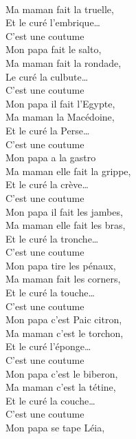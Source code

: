 \\Ma maman fait la truelle, \bissimple
\\Et le curé l’embrique… \bissimple
\\
{C’est une coutume}
\\Mon papa fait le salto, \bissimple
\\Ma maman fait la rondade, \bissimple
\\Le curé la culbute… \bissimple
\\
{C’est une coutume}
\\Mon papa il fait l’Egypte, \bissimple
\\Ma maman la Macédoine, \bissimple
\\Et le curé la Perse… \bissimple
\\
{C’est une coutume}
\\Mon papa a la gastro \bissimple
\\Ma maman elle fait la grippe, \bissimple
\\Et le curé la crève… \bissimple
\\
{C’est une coutume}
\\Mon papa il fait les jambes, \bissimple
\\Ma maman elle fait les bras, \bissimple
\\Et le curé la tronche… \bissimple
\\
{C’est une coutume}
\\Mon papa tire les pénaux, \bissimple
\\Ma maman fait les corners, \bissimple
\\Et le curé la touche… \bissimple
\breakpage
\\
{C’est une coutume}
\\Mon papa c’est Paic citron, \bissimple
\\Ma maman c’est le torchon, \bissimple
\\Et le curé l’éponge… \bissimple
\\
{C’est une coutume}
\\Mon papa c’est le biberon, \bissimple
\\Ma maman c’est la tétine, \bissimple
\\Et le curé la couche… \bissimple
\\
{C’est une coutume}
\\Mon papa se tape Léia, \bissimple
